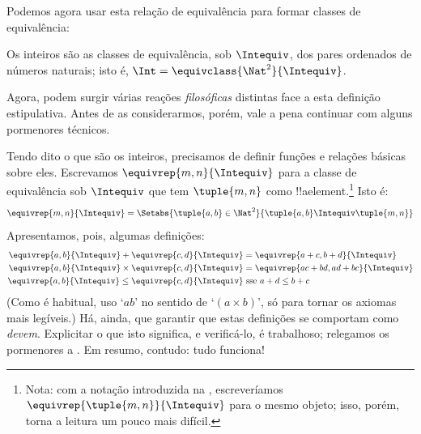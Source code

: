 \documentclass[../../../include/open-logic-section]{subfiles}
\begin{document}
Podemos agora usar esta relação de equivalência para formar classes de equivalência:

\begin{defn}
		Os inteiros são as classes de equivalência, sob $\Intequiv$, dos pares ordenados de números naturais; isto é, $\Int = \equivclass{\Nat^2}{\Intequiv}$.
\end{defn}

Agora, podem surgir várias reações \emph{filosóficas} distintas face a esta definição estipulativa. Antes de as considerarmos, porém, vale a pena continuar com alguns pormenores técnicos.

Tendo dito o que são os inteiros, precisamos de definir funções e relações básicas sobre eles. Escrevamos $\equivrep{m, n}{\Intequiv}$ para a classe de equivalência sob $\Intequiv$ que tem $\tuple{m, n}$ como !!a{element}.\footnote{Nota: com a notação introduzida na , escreveríamos $\equivrep{\tuple{m,n}}{\Intequiv}$ para o mesmo objeto; isso, porém, torna a leitura um pouco mais difícil.} Isto é:
	$$\equivrep{m, n}{\Intequiv} = \Setabs{\tuple{a, b} \in \Nat^2}{\tuple{a, b}\Intequiv \tuple{m, n}}$$
Apresentamos, pois, algumas definições:
	\begin{align*}
		\equivrep{a, b}{\Intequiv} + \equivrep{c, d}{\Intequiv} &= \equivrep{a + c, b + d}{\Intequiv}\\
		\equivrep{a, b}{\Intequiv} \times \equivrep{c, d}{\Intequiv} &= \equivrep{a c + b  d, a  d + b c}{\Intequiv}\\
		\equivrep{a, b}{\Intequiv} \leq \equivrep{c, d}{\Intequiv} &\text{ sse }a + d \leq b + c
	\end{align*}	
(Como é habitual, uso `$ab$' no sentido de `$(a \times b)$', só para tornar os axiomas mais legíveis.) Há, ainda, que garantir que estas definições se comportam como \emph{devem}. Explicitar o que isto significa, e verificá-lo, é trabalhoso; relegamos os pormenores a . Em resumo, contudo: tudo funciona!
\end{document}
